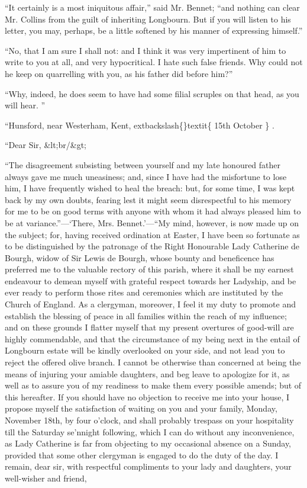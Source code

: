 \documentclass[10pt]{book}
\begin{document}
   “It certainly is a most iniquitous affair,” said Mr. Bennet; “and
nothing can clear Mr. Collins from the guilt of inheriting Longbourn.
But if you will listen to his letter, you may, perhaps, be a little
softened by his manner of expressing himself.”
  

   “No, that I am sure I shall not: and I think it was very impertinent of
him to write to you at all, and very hypocritical. I hate such false
friends. Why could not he keep on quarrelling with you, as his father
did before him?”
  

   “Why, indeed, he does seem to have had some filial scruples on that
head, as you will hear.
   ”
  

    “Hunsford, near Westerham, Kent,
    	extbackslash\{\}textit\{
     15th October
    \}
    .
   

    “Dear Sir,
    &lt;br/&gt;

    “The disagreement subsisting between yourself and my late honoured
father always gave me much uneasiness; and, since I have had the
misfortune to lose him, I have frequently wished to heal the
breach: but, for some time, I was kept back by my own doubts,
fearing lest it might seem disrespectful to his memory for me to be
on good terms with anyone with whom it had always pleased him to be
at variance.”—‘There, Mrs. Bennet.’—“My mind, however, is now
made up on the subject; for, having received ordination at Easter,
I have been so fortunate as to be distinguished by the patronage of
the Right Honourable Lady Catherine de Bourgh, widow of Sir Lewis
de Bourgh, whose bounty and beneficence has preferred me to the
valuable rectory of this parish, where it shall be my earnest
endeavour to demean myself with grateful respect towards her
Ladyship, and be ever ready to perform those rites and ceremonies
which are instituted by the Church of England. As a clergyman,
moreover, I feel it my duty to promote and establish the blessing
of peace in all families within the reach of my influence; and on
these grounds I flatter myself that my present overtures of
good-will are highly commendable, and that the circumstance of my
being next in the entail of Longbourn estate will be kindly
overlooked on your side, and not lead you to reject the offered
olive branch. I cannot be otherwise than concerned at being the
means of injuring your amiable daughters, and beg leave to
apologize for it, as well as to assure you of my readiness to make
them every possible amends; but of this hereafter. If you should
have no objection to receive me into
    your house, I propose myself
the satisfaction of waiting on you and your family, Monday,
November 18th, by four o’clock, and shall probably trespass on your
hospitality till the Saturday se’nnight following, which I can do
without any inconvenience, as Lady Catherine is far from objecting
to my occasional absence on a Sunday, provided that some other
clergyman is engaged to do the duty of the day. I remain, dear sir,
with respectful compliments to your lady and daughters, your
well-wisher and friend,
   
\end{document}
